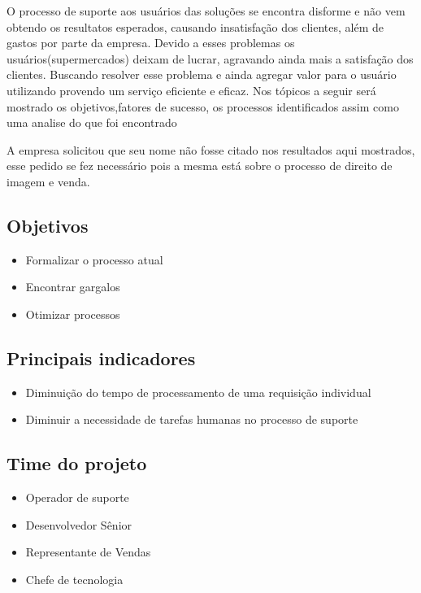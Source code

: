 \documentclass[11pt,a4paper]{article}
\begin{document}
		O processo de suporte aos usuários das soluções se encontra disforme e não vem obtendo
	os resultatos esperados, causando insatisfação dos clientes, além de gastos por parte da empresa.
	Devido a esses problemas os usuários(supermercados) deixam de lucrar, agravando ainda mais a satisfação
	dos clientes. Buscando resolver esse problema e ainda agregar valor para o usuário utilizando provendo
	um serviço eficiente e eficaz.
	Nos tópicos a seguir será mostrado os objetivos,fatores de sucesso, os processos
	identificados assim como uma analise do que foi encontrado

	A empresa solicitou que seu nome não fosse citado nos resultados aqui mostrados, esse pedido
	se fez necessário pois a mesma está sobre o processo de direito de imagem e venda.

\subsection{Objetivos}
\begin{itemize}[noitemsep]
  \item Formalizar o processo atual
  \item Encontrar gargalos
  \item Otimizar processos
\end{itemize}

\subsection{Principais indicadores}
\begin{itemize}[noitemsep]
  \item Diminuição do tempo de processamento de uma requisição individual
  \item Diminuir a necessidade de tarefas humanas no processo de suporte
\end{itemize}

\subsection{Time do projeto}
\begin{itemize}[noitemsep]
  \item Operador de suporte
  \item Desenvolvedor Sênior
  \item Representante de Vendas
  \item Chefe de tecnologia
\end{itemize}
\end{document}
